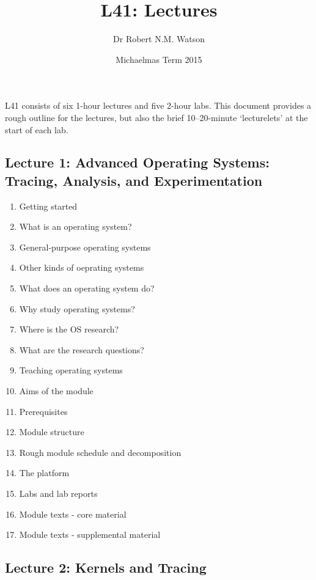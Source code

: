 \documentclass[a4paper,10pt]{article}
\begin{document}
\title{L41: Lectures}
\author{Dr Robert N.M. Watson}
\date{Michaelmas Term 2015}
\maketitle

\noindent
L41 consists of six 1-hour lectures and five 2-hour labs.
This document provides a rough outline for the lectures, but also the brief
10--20-minute `lecturelets' at the start of each lab.

\subsection*{Lecture 1: Advanced Operating Systems: Tracing, Analysis, and
  Experimentation}

\begin{enumerate}
  \item Getting started
  \item What is an operating system?
  \item General-purpose operating systems
  \item Other kinds of oeprating systems
  \item What does an operating system do?
  \item Why study operating systems?
  \item Where is the OS research?
  \item What are the research questions?
  \item Teaching operating systems
  \item Aims of the module
  \item Prerequisites
  \item Module structure
  \item Rough module schedule and decomposition
  \item The platform
  \item Labs and lab reports
  \item Module texts - core material
  \item Module texts - supplemental material
\end{enumerate}

\subsection*{Lecture 2: Kernels and Tracing}
\end{document}
